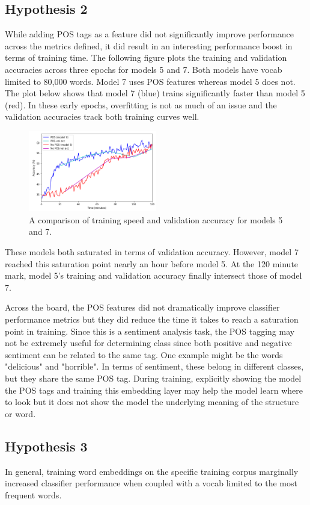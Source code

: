 \subsection{Hypothesis 2}
While adding POS tags as a feature did not significantly improve performance across the metrics defined, it did result in an interesting performance boost in terms of training time. The following figure plots the training and validation accuracies across three epochs for models 5 and 7. Both models have vocab limited to 80,000 words. Model 7 uses POS features whereas model 5 does not. The plot below shows that model 7 (blue) trains significantly faster than model 5 (red). In these early epochs, overfitting is not as much of an issue and the validation accuracies track both training curves well.
\begin{figure}[H]
	\includegraphics[width=0.5\textwidth]{images/training_speed.png}
	\caption{A comparison of training speed and validation accuracy for models 5 and 7.}
\end{figure}
These models both saturated in terms of validation accuracy. However, model 7 reached this saturation point nearly an hour before model 5. At the 120 minute mark, model 5's training and validation accuracy finally intersect those of model 7.
\par 
Across the board, the POS features did not dramatically improve classifier performance metrics but they did reduce the time it takes to reach a saturation point in training. Since this is a sentiment analysis task, the POS tagging may not be extremely useful for determining class since both positive and negative sentiment can be related to the same tag. One example might be the words "delicious" and "horrible". In terms of sentiment, these belong in different classes, but they share the same POS tag. During training, explicitly showing the model the POS tags and training this embedding layer may help the model learn where to look but it does not show the model the underlying meaning of the structure or word.

\subsection{Hypothesis 3}
In general, training word embeddings on the specific training corpus marginally increased classifier performance when coupled with a vocab limited to the most frequent words.

